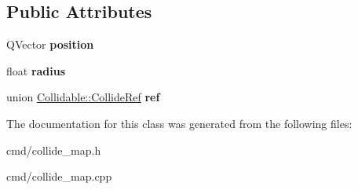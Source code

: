 \subsection*{Public Attributes}
\begin{DoxyCompactItemize}
\item 
Q\+Vector {\bfseries position}\hypertarget{classCollidable_a4fd02dce0d75aa0a7501ea003671a3d6}{}\label{classCollidable_a4fd02dce0d75aa0a7501ea003671a3d6}

\item 
float {\bfseries radius}\hypertarget{classCollidable_a3ddf08ec019976df1adae29e476b9bec}{}\label{classCollidable_a3ddf08ec019976df1adae29e476b9bec}

\item 
union \hyperlink{unionCollidable_1_1CollideRef}{Collidable\+::\+Collide\+Ref} {\bfseries ref}\hypertarget{classCollidable_a02283d9a0edced2eb2014184a0b2d0e5}{}\label{classCollidable_a02283d9a0edced2eb2014184a0b2d0e5}

\end{DoxyCompactItemize}


The documentation for this class was generated from the following files\+:\begin{DoxyCompactItemize}
\item 
cmd/collide\+\_\+map.\+h\item 
cmd/collide\+\_\+map.\+cpp\end{DoxyCompactItemize}
